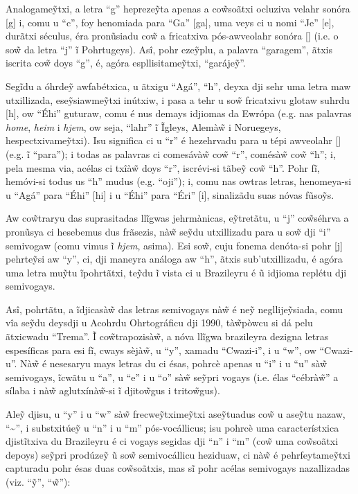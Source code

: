 \documentclass[12pt, a5paper, titlepage]{article}
\begin{document}
\begin{bilingualpages}
    Analogame\~ytxi, a letra ``g'' hepreze\~yta apenas a co\~wsoãtxi ocluziva velahr sonóra [g] i, comu u ``c'', foy henomiada para ``Ga'' [ga], uma veys ci u nomi ``Je'' [\textyogh e], durãtxi séculus, éra pronũsiadu co\~w a fricatxiva pós-awveolahr sonóra [\textyogh] (i.e. o so\~w da letra ``j'' ĩ Pohrtugeys). Asî, pohr eze\~yplu, a palavra ``garagem'', ãtxis iscrita co\~w doys ``g'', é, agóra espllisitame\~ytxi, ``garáje\~y''.

    Segĩdu a óhrde\~y awfabétxica, u ãtxigu ``Agá'', ``h'', deyxa dji sehr uma letra maw utxillizada, ese\~ysiawme\~ytxi inútxiw, i pasa a tehr u so\~w fricatxivu glotaw suhrdu [h], ow ``Éhi'' guturaw, comu é nus demays idjiomas da Ewrópa (e.g. nas palavras \textit{home}, \textit{heim} i \textit{hjem}, ow seja, ``lahr'' ĩ Ĩgleys, Alemà\~w i Noruegeys, hespectxivame\~ytxi). Isu significa ci u ``r'' é hezehrvadu para u tépi awveolahr [\textfishhookr] (e.g. ĩ ``para''); i todas as palavras ci comesávà\~w co\~w ``r'', comésà\~w co\~w ``h''; i, pela mesma via, acélas ci txîà\~w doys ``r'', iscrévi-si tãbe\~y co\~w ``h''. Pohr fĩ, hemóvi-si todus us ``h'' mudus (e.g. ``oji''); i, comu nas owtras letras, henomeya-si u ``Agá'' para ``Éhi'' [\textepsilon hi] i u ``Éhi'' para ``Éri'' [\textepsilon \textfishhookr i], sinalizãdu suas nóvas fũso\~ys.

    Aw co\~wtraryu das suprasitadas llĩgwas jehrmànicas, e\~ytretãtu, u ``j'' co\~wséhrva a pronũsya ci hesebemus dus frãsezis, nà\~w se\~ydu utxillizadu para u so\~w dji ``i'' semivogaw (comu vimus ĩ \textit{hjem}, asima). Esi so\~w, cuju fonema denóta-si pohr [j] pehrte\~ysi aw ``y'', ci, dji maneyra análoga aw ``h'', ãtxis sub'utxillizadu, é agóra uma letra mu\~ytu ĩpohrtãtxi, te\~ydu ĩ vista ci u Brazileyru é ũ idjioma replétu dji semivogays. 

    Asî, pohrtãtu, a ĩdjicasà\~w das letras semivogays nà\~w é ne\~y negllije\~ysiada, comu vîa se\~ydu deysdji u Acohrdu Ohrtográficu dji 1990, tà\~wpòwcu si dá pelu ãtxicwadu ``Trema''. Ĩ co\~wtrapozisà\~w, a nóva llĩgwa brazileyra dezigna letras espesíficas para esi fĩ, cways sèjà\~w, u ``y'', xamadu ``Cwazi-i'', i u ``w'', ow ``Cwazi-u''. Nà\~w é nesesaryu mays letras du ci ésas, pohrcè apenas u ``i'' i u ``u'' sà\~w semivogays, ĩcwãtu u ``a'', u ``e'' i u ``o'' sà\~w se\~ypri vogays (i.e. élas ``cébrà\~w'' a sílaba i nà\~w aglutxínà\~w-si ĩ djito\~wgus i trito\~wgus).

    Ale\~y djisu, u ``y'' i u ``w'' sà\~w frecwe\~ytxime\~ytxi ase\~ytuadus co\~w u ase\~ytu nazaw, ``\textasciitilde'', i substxitúe\~y u ``n'' i u ``m'' pós-vocállicus; isu pohrcè uma característxica djistĩtxiva du Brazileyru é ci vogays segidas dji ``n'' i ``m'' (co\~w uma co\~wsoãtxi depoys) se\~ypri prodúze\~y ũ so\~w semivocállicu heziduaw, ci nà\~w é pehrfeytame\~ytxi capturadu pohr ésas duas co\~wsoãtxis, mas sĩ pohr acélas semivogays nazallizadas (viz. ``\~y'', ``\~w''):


\end{bilingualpages}
\end{document}
